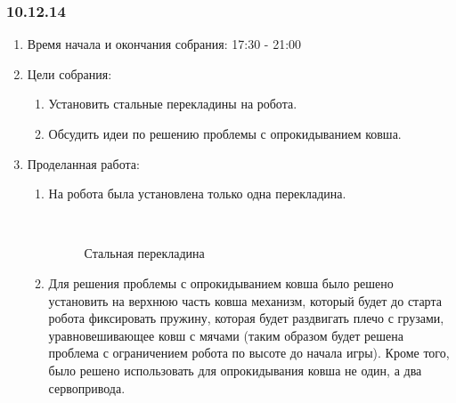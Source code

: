 \subsubsection{10.12.14}

\begin{enumerate}
	\item Время начала и окончания собрания:
	17:30 - 21:00
	\item Цели собрания:
	\begin{enumerate}
	  \item Установить стальные перекладины на робота.
	  
	  \item Обсудить идеи по решению проблемы с опрокидыванием ковша.
	  
    \end{enumerate}
	\item Проделанная работа:
	\begin{enumerate}
	  \item На робота была установлена только одна перекладина.
	  
	  \begin{figure}[H]
	  	\begin{minipage}[h]{0.2\linewidth}
	  		\center  
	  	\end{minipage}
	  	\begin{minipage}[h]{0.6\linewidth}
	  		\caption{Стальная перекладина}
	  	\end{minipage}
	  \end{figure}
	  
	  \item Для решения проблемы с опрокидыванием ковша было решено установить на верхнюю часть ковша механизм, который будет до старта робота фиксировать пружину, которая будет раздвигать плечо с грузами, уравновешивающее ковш с мячами (таким образом будет решена проблема с ограничением робота по высоте до начала игры). Кроме того, было решено использовать для опрокидывания ковша не один, а два сервопривода.
	  
      

\end{enumerate}
\end{enumerate}

